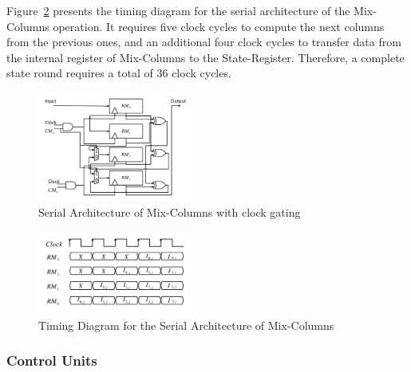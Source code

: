 \documentclass[final,5p,times,twocolumn]{elsarticle}
\begin{document}
Figure~\ref{serial_time_diagrm_mix_colunms} presents the timing diagram for the serial architecture of the Mix-Columns operation.
It requires five clock cycles to compute the next columns from the previous ones, and an additional four clock cycles to transfer data from the internal register of Mix-Columns to the State-Register.
Therefore, a complete state round requires a total of 36 clock cycles.


\begin{figure}[h]%
    \centering
    \includegraphics[width=0.45\textwidth]{./Mix-Columns.pdf}
    \caption{Serial Architecture of Mix-Columns with clock gating}\label{serial_mix_columns_fig}
\end{figure}

\begin{figure}[h]%
    \centering
    \includegraphics[width=0.45\textwidth]{./Mix-Columns-Times.pdf}
    \caption{Timing Diagram for the Serial Architecture of Mix-Columns }
    \label{serial_time_diagrm_mix_colunms}
\end{figure}

\subsubsection{Control Units}\label{subsubsec3}
\end{document}

